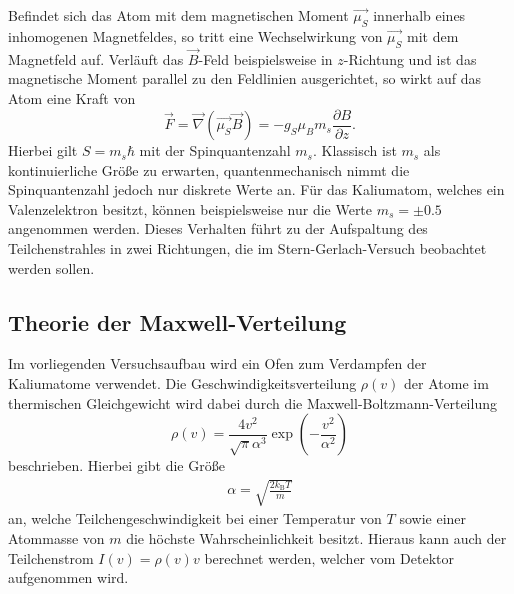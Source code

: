 Befindet sich das Atom mit dem magnetischen Moment $\vec{\mu_S}$ innerhalb eines inhomogenen Magnetfeldes, so tritt eine Wechselwirkung von $\vec{\mu_S}$ mit dem Magnetfeld auf.
Verläuft das $\vec{B}$-Feld beispielsweise in $z$-Richtung und ist das magnetische Moment parallel zu den Feldlinien ausgerichtet, so wirkt auf das Atom eine Kraft von
\begin{equation}
  \vec{F} = \vec{\nabla}\!\left( \vec{\mu_S} \vec{B} \right) = -g_S \mu_B m_s \frac{\partial B}{\partial z}.
\end{equation}
Hierbei gilt $S=m_s \hbar$ mit der Spinquantenzahl $m_s$.
Klassisch ist $m_s$ als kontinuierliche Größe zu erwarten, quantenmechanisch nimmt die Spinquantenzahl jedoch nur diskrete Werte an.
Für das Kaliumatom, welches ein Valenzelektron besitzt, können beispielsweise nur die Werte $m_s = \pm \num{0.5}$ angenommen werden.
Dieses Verhalten führt zu der Aufspaltung des Teilchenstrahles in zwei Richtungen, die im Stern-Gerlach-Versuch beobachtet werden sollen.

\subsection{Theorie der Maxwell-Verteilung}

Im vorliegenden Versuchsaufbau wird ein Ofen zum Verdampfen der Kaliumatome verwendet.
Die Geschwindigkeitsverteilung $\rho(v)$ der Atome im thermischen Gleichgewicht wird dabei durch die Maxwell-Boltzmann-Verteilung
\begin{equation}
  \label{eqn:geschwindigkeit}
  \rho(v) = \frac{4 v^2}{\sqrt{\pi}\alpha^3} \exp{\left(-\frac{v^2}{\alpha^2} \right)}
\end{equation}
beschrieben.
Hierbei gibt die Größe
\begin{align*}
  \alpha = \sqrt{ \frac{2 k_\text{B} T}{m}}
\end{align*}
an, welche Teilchengeschwindigkeit bei einer Temperatur von $T$ sowie einer Atommasse von $m$ die höchste Wahrscheinlichkeit besitzt.
Hieraus kann auch der Teilchenstrom $I(v) = \rho(v) v$ berechnet werden, welcher vom Detektor aufgenommen wird.
